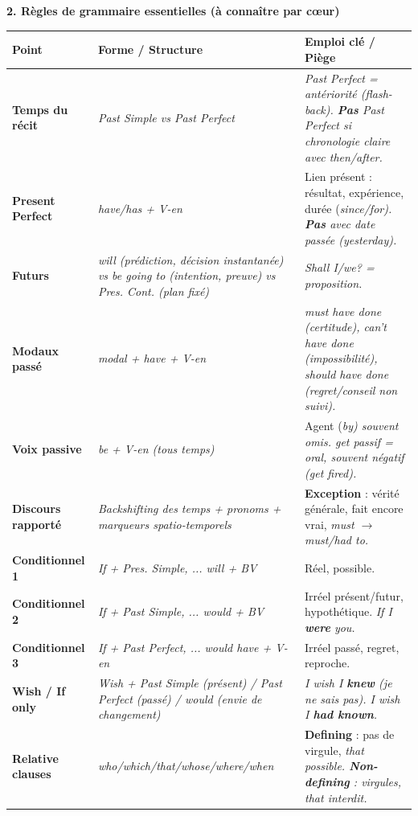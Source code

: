 \documentclass[11pt]{article}
\newcommand{\eng}[1]{\ifmmode\text{\textit{#1}}\else\begingroup\selectlanguage{english}\itshape #1\endgroup\fi}
\begin{document}
\begin{bilan}
\textbf{2. Règles de grammaire essentielles (à connaître par cœur)}
\begin{center}
\begin{tabularx}{\linewidth}{|X|X|X|}
\hline
\rowcolor{popblueL} \textbf{Point} & \textbf{Forme / Structure} & \textbf{Emploi clé / Piège} \\
\hline
\textbf{Temps du récit} & \eng{Past Simple} vs \eng{Past Perfect} & \eng{Past Perfect} = antériorité (flash-back). \textbf{Pas} \eng{Past Perfect} si chronologie claire avec \eng{then/after}. \\
\textbf{Present Perfect} & \eng{have/has + V-en} & Lien présent : résultat, expérience, durée (\eng{since/for}). \textbf{Pas} avec date passée (\eng{yesterday}). \\
\textbf{Futurs} & \eng{will} (prédiction, décision instantanée) vs \eng{be going to} (intention, preuve) vs \eng{Pres. Cont.} (plan fixé) & \eng{Shall I/we?} = proposition. \\
\textbf{Modaux passé} & \eng{modal + have + V-en} & \eng{must have done} (certitude), \eng{can't have done} (impossibilité), \eng{should have done} (regret/conseil non suivi). \\
\textbf{Voix passive} & \eng{be + V-en} (tous temps) & Agent (\eng{by}) souvent omis. \eng{get} passif = oral, souvent négatif (\eng{get fired}). \\
\textbf{Discours rapporté} & \eng{Backshifting} des temps + pronoms + marqueurs spatio-temporels & \textbf{Exception} : vérité générale, fait encore vrai, \eng{must} $\to$ \eng{must/had to}. \\
\textbf{Conditionnel 1} & \eng{If + Pres. Simple, ... will + BV} & Réel, possible. \\
\textbf{Conditionnel 2} & \eng{If + Past Simple, ... would + BV} & Irréel présent/futur, hypothétique. \eng{If I \textbf{were} you}. \\
\textbf{Conditionnel 3} & \eng{If + Past Perfect, ... would have + V-en} & Irréel passé, regret, reproche. \\
\textbf{Wish / If only} & \eng{Wish + Past Simple} (présent) / \eng{Past Perfect} (passé) / \eng{would} (envie de changement) & \eng{I wish I \textbf{knew}} (je ne sais pas). \eng{I wish I \textbf{had known}}. \\
\textbf{Relative clauses} & \eng{who/which/that/whose/where/when} & \textbf{Defining} : pas de virgule, \eng{that} possible. \textbf{Non-defining} : virgules, \eng{that} interdit. \\
\hline
\end{tabularx}
\end{center}


\end{bilan}
\end{document}
